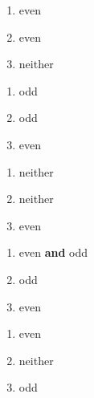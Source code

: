 \begin{multicols}{3}
\begin{enumerate}
\setcounter{enumi}{\value{HW}}

\item even
\item even
\item neither

\setcounter{HW}{\value{enumi}}
\end{enumerate}
\end{multicols}


\begin{multicols}{3}
\begin{enumerate}
\setcounter{enumi}{\value{HW}}

\item odd
\item odd
\item even

\setcounter{HW}{\value{enumi}}
\end{enumerate}
\end{multicols}

\begin{multicols}{3}
\begin{enumerate}
\setcounter{enumi}{\value{HW}}

\item neither
\item neither
\item even

\setcounter{HW}{\value{enumi}}
\end{enumerate}
\end{multicols}

\begin{multicols}{3}
\begin{enumerate}
\setcounter{enumi}{\value{HW}}

\item even \textbf{and} odd
\item odd
\item even

\setcounter{HW}{\value{enumi}}
\end{enumerate}
\end{multicols}

\begin{multicols}{3}
\begin{enumerate}
\setcounter{enumi}{\value{HW}}

\item even
\item neither
\item odd

\setcounter{HW}{\value{enumi}}
\end{enumerate}
\end{multicols}

